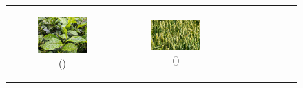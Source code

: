\documentclass{BachelorBUI}
\begin{document}
\begin{figure}[h]
\begin{tabular}{ccc}
\begin{subfigure}{0.30\textwidth}
                    \includegraphics[width=\textwidth]{4_artificial_background.jpg}
                    \caption{\centering (\cite{4_artificial_background:2023})}
                \end{subfigure} &
                \begin{subfigure}{0.30\textwidth}
                    \centering
                    \includegraphics[width=\textwidth]{5_artificial_background.jpg}
                    \caption{\centering (\cite{5_artificial_background:2022})}
                \end{subfigure} &
                \begin{subfigure}{0.30\textwidth}
                    \centering

\end{subfigure}
\end{tabular}
\end{figure}
\end{document}
